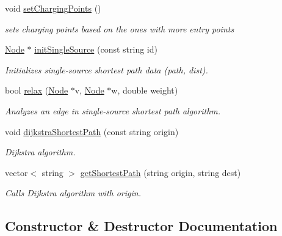 \begin{DoxyCompactItemize}
\item 
\mbox{\label{class_graph_a242bfef1fd40e84c0c1089bef6879198}} 
void \mbox{\hyperlink{class_graph_a242bfef1fd40e84c0c1089bef6879198}{set\+Charging\+Points}} ()
\begin{DoxyCompactList}\small\item\em sets charging points based on the ones with more entry points \end{DoxyCompactList}\item 
\mbox{\hyperlink{class_node}{Node}} $\ast$ \mbox{\hyperlink{class_graph_a94386342ca91dcb2022745eb289dbc16}{init\+Single\+Source}} (const string id)
\begin{DoxyCompactList}\small\item\em Initializes single-\/source shortest path data (path, dist). \end{DoxyCompactList}\item 
bool \mbox{\hyperlink{class_graph_a2c013e691f7306c0b46dd0b900b43389}{relax}} (\mbox{\hyperlink{class_node}{Node}} $\ast$v, \mbox{\hyperlink{class_node}{Node}} $\ast$w, double weight)
\begin{DoxyCompactList}\small\item\em Analyzes an edge in single-\/source shortest path algorithm. \end{DoxyCompactList}\item 
void \mbox{\hyperlink{class_graph_acc8c0f30f708afa2bb067f94147fb471}{dijkstra\+Shortest\+Path}} (const string origin)
\begin{DoxyCompactList}\small\item\em Dijkstra algorithm. \end{DoxyCompactList}\item 
vector$<$ string $>$ \mbox{\hyperlink{class_graph_a437976400df5ab50b20703be4f88e6e7}{get\+Shortest\+Path}} (string origin, string dest)
\begin{DoxyCompactList}\small\item\em Calls Dijkstra algorithm with origin. \end{DoxyCompactList}\end{DoxyCompactItemize}


\subsection{Constructor \& Destructor Documentation}
\mbox{\label{class_graph_ae4c72b8ac4d693c49800a4c7e273654f}} 
